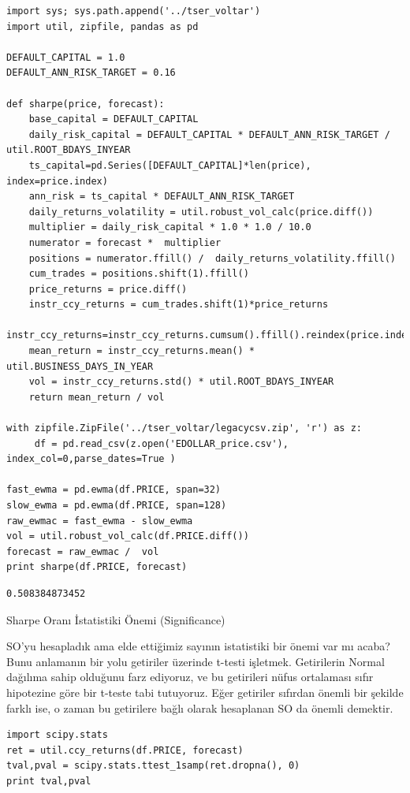 \documentclass[12pt,fleqn]{article}\usepackage{../../common}
\begin{document}
\begin{verbatim}  
import sys; sys.path.append('../tser_voltar')
import util, zipfile, pandas as pd

DEFAULT_CAPITAL = 1.0
DEFAULT_ANN_RISK_TARGET = 0.16

def sharpe(price, forecast):
    base_capital = DEFAULT_CAPITAL
    daily_risk_capital = DEFAULT_CAPITAL * DEFAULT_ANN_RISK_TARGET / util.ROOT_BDAYS_INYEAR 
    ts_capital=pd.Series([DEFAULT_CAPITAL]*len(price), index=price.index)        
    ann_risk = ts_capital * DEFAULT_ANN_RISK_TARGET
    daily_returns_volatility = util.robust_vol_calc(price.diff())
    multiplier = daily_risk_capital * 1.0 * 1.0 / 10.0
    numerator = forecast *  multiplier
    positions = numerator.ffill() /  daily_returns_volatility.ffill()
    cum_trades = positions.shift(1).ffill()
    price_returns = price.diff()
    instr_ccy_returns = cum_trades.shift(1)*price_returns 
    instr_ccy_returns=instr_ccy_returns.cumsum().ffill().reindex(price.index).diff()
    mean_return = instr_ccy_returns.mean() * util.BUSINESS_DAYS_IN_YEAR
    vol = instr_ccy_returns.std() * util.ROOT_BDAYS_INYEAR
    return mean_return / vol
      
with zipfile.ZipFile('../tser_voltar/legacycsv.zip', 'r') as z:
     df = pd.read_csv(z.open('EDOLLAR_price.csv'), index_col=0,parse_dates=True )

fast_ewma = pd.ewma(df.PRICE, span=32)
slow_ewma = pd.ewma(df.PRICE, span=128)
raw_ewmac = fast_ewma - slow_ewma
vol = util.robust_vol_calc(df.PRICE.diff())
forecast = raw_ewmac /  vol 
print sharpe(df.PRICE, forecast)
\end{verbatim}

\begin{verbatim}
0.508384873452
\end{verbatim}

Sharpe Oranı İstatistiki Önemi (Significance)

SO'yu hesapladık ama elde ettiğimiz sayının istatistiki bir önemi var mı acaba?
Bunu anlamanın bir yolu getiriler üzerinde t-testi işletmek. Getirilerin Normal
dağılıma sahip olduğunu farz ediyoruz, ve bu getirileri nüfus ortalaması sıfır
hipotezine göre bir t-teste tabi tutuyoruz. Eğer getiriler sıfırdan önemli bir
şekilde farklı ise, o zaman bu getirilere bağlı olarak hesaplanan SO da önemli
demektir. 

\begin{verbatim}
import scipy.stats
ret = util.ccy_returns(df.PRICE, forecast)
tval,pval = scipy.stats.ttest_1samp(ret.dropna(), 0)
print tval,pval
\end{verbatim}
\end{document}
